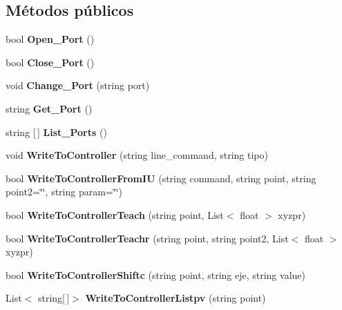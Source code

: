 \subsection*{Métodos públicos}
\begin{DoxyCompactItemize}
\item 
\mbox{\label{class_serial_controller_a034048c8c3255ce628c92cd057235213}} 
bool {\bfseries Open\+\_\+\+Port} ()
\item 
\mbox{\label{class_serial_controller_a23485c31539d33d4e0eccfdaf40f171a}} 
bool {\bfseries Close\+\_\+\+Port} ()
\item 
\mbox{\label{class_serial_controller_a592468c9c1d12a261b2608b9ea1b6880}} 
void {\bfseries Change\+\_\+\+Port} (string port)
\item 
\mbox{\label{class_serial_controller_a3f88952ad282257d08f47bed4a81f754}} 
string {\bfseries Get\+\_\+\+Port} ()
\item 
\mbox{\label{class_serial_controller_a20743630ff1cbfe523cb253fa0831328}} 
string \mbox{[}$\,$\mbox{]} {\bfseries List\+\_\+\+Ports} ()
\item 
\mbox{\label{class_serial_controller_af34771a5c8dcfb653c1eb1d9247fff25}} 
void {\bfseries Write\+To\+Controller} (string line\+\_\+command, string tipo)
\item 
\mbox{\label{class_serial_controller_a50cc6305d096079c01788e4b46f3decf}} 
bool {\bfseries Write\+To\+Controller\+From\+IU} (string command, string point, string point2=\char`\"{}\char`\"{}, string param=\char`\"{}\char`\"{})
\item 
\mbox{\label{class_serial_controller_a158fcf36bb5fd21a7a43f9c0495b621b}} 
bool {\bfseries Write\+To\+Controller\+Teach} (string point, List$<$ float $>$ xyzpr)
\item 
\mbox{\label{class_serial_controller_a228d51508d97eca6e6c3cd055f10832c}} 
bool {\bfseries Write\+To\+Controller\+Teachr} (string point, string point2, List$<$ float $>$ xyzpr)
\item 
\mbox{\label{class_serial_controller_a2d1314323db76bbef50d0c5ef1c381a2}} 
bool {\bfseries Write\+To\+Controller\+Shiftc} (string point, string eje, string value)
\item 
\mbox{\label{class_serial_controller_a68d60934a79400a1171aba1fffa68768}} 
List$<$ string\mbox{[}$\,$\mbox{]}$>$ {\bfseries Write\+To\+Controller\+Listpv} (string point)
\end{DoxyCompactItemize}
